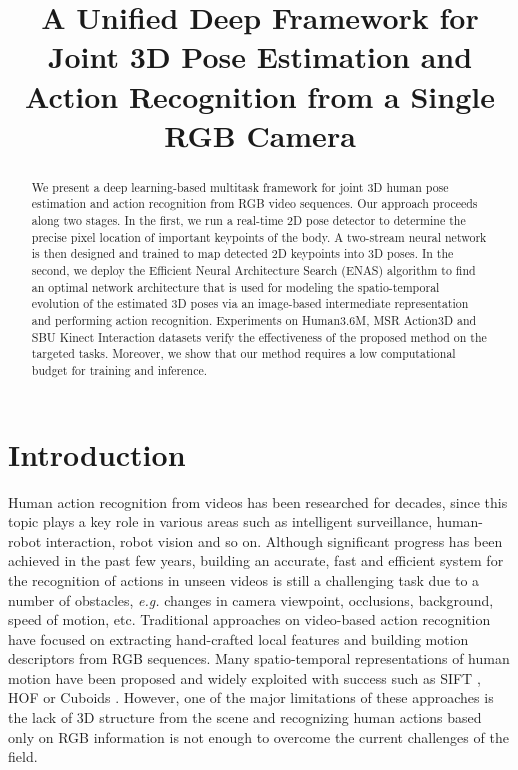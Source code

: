 \documentclass{bmvc2k}
\title{A Unified Deep Framework for Joint 3D Pose Estimation and Action Recognition from a Single RGB Camera}
\begin{document}
\maketitle

\begin{abstract}
We present a deep learning-based multitask framework for joint 3D human pose estimation and action recognition from RGB video sequences. Our approach proceeds along two stages. In the first, we run a real-time 2D pose detector to determine the precise pixel location of important keypoints of the body. A two-stream neural network is then designed and trained to map detected 2D keypoints into 3D poses. In the second, we deploy the Efficient Neural Architecture Search (ENAS) algorithm to find an optimal network architecture that is used for modeling the spatio-temporal evolution of the estimated 3D poses via an image-based intermediate representation and performing action recognition. Experiments on Human3.6M, MSR Action3D and SBU Kinect Interaction datasets verify the effectiveness of the proposed method on the targeted tasks. Moreover, we show that our method requires a low computational budget for training and inference.
\end{abstract} 

\section{Introduction \\[-0.2cm]}\label{sec:intro} 
Human action recognition from videos has been researched for decades, since this topic plays a key role in various areas such as intelligent surveillance, human-robot interaction, robot vision and so on. Although significant progress has been achieved in the past few years, building an accurate, fast and efficient system for the recognition of actions in unseen videos is still a challenging task due to a number of obstacles, \textit{e.g.} changes in camera viewpoint, occlusions, background, speed of motion, etc. Traditional approaches on video-based action recognition \cite{weinland2011survey} have focused on extracting hand-crafted local features and building motion descriptors from RGB sequences. Many spatio-temporal representations of human motion have been proposed and widely exploited with success such as SIFT \cite{lowe2004distinctive}, HOF \cite{laptev2008learning} or Cuboids \cite{dollar2005behavior}. However, one of the major limitations of these approaches is the lack of 3D structure from the scene and recognizing human actions based only on RGB information is not enough to overcome the current challenges of the field. 
\end{document}
